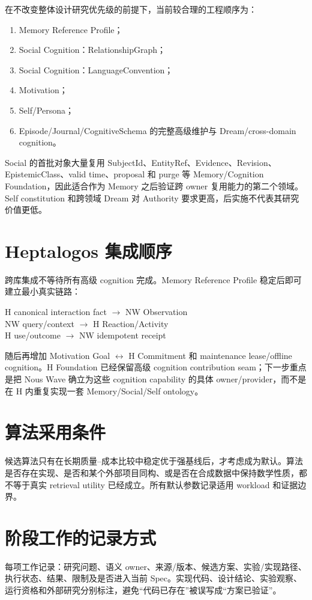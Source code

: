 在不改变整体设计研究优先级的前提下，当前较合理的工程顺序为：

\begin{enumerate}
\item Memory Reference Profile；
\item Social Cognition：RelationshipGraph；
\item Social Cognition：LanguageConvention；
\item Motivation；
\item Self/Persona；
\item Episode/Journal/CognitiveSchema 的完整高级维护与 Dream/cross-domain cognition。
\end{enumerate}

Social 的首批对象大量复用 SubjectId、EntityRef、Evidence、Revision、EpistemicClass、valid time、proposal 和 purge 等 Memory/Cognition Foundation，因此适合作为 Memory 之后验证跨 owner 复用能力的第二个领域。Self constitution 和跨领域 Dream 对 Authority 要求更高，后实施不代表其研究价值更低。

\section{Heptalogos 集成顺序}

跨库集成不等待所有高级 cognition 完成。Memory Reference Profile 稳定后即可建立最小真实链路：

\begin{center}
H canonical interaction fact $\rightarrow$ NW Observation\\
NW query/context $\rightarrow$ H Reaction/Activity\\
H use/outcome $\rightarrow$ NW idempotent receipt
\end{center}

随后再增加 Motivation Goal $\leftrightarrow$ H Commitment 和 maintenance lease/offline cognition。H Foundation 已经保留高级 cognition contribution seam；下一步重点是把 Nous Wave 确立为这些 cognition capability 的具体 owner/provider，而不是在 H 内重复实现一套 Memory/Social/Self ontology。

\section{算法采用条件}

候选算法只有在长期质量--成本比较中稳定优于强基线后，才考虑成为默认。算法是否存在实现、是否和某个外部项目同构、或是否在合成数据中保持数学性质，都不等于真实 retrieval utility 已经成立。所有默认参数记录适用 workload 和证据边界。\cite{nous-research-package}

\section{阶段工作的记录方式}

每项工作记录：研究问题、语义 owner、来源/版本、候选方案、实验/实现路径、执行状态、结果、限制及是否进入当前 Spec。实现代码、设计结论、实验观察、运行资格和外部研究分别标注，避免“代码已存在”被误写成“方案已验证”。